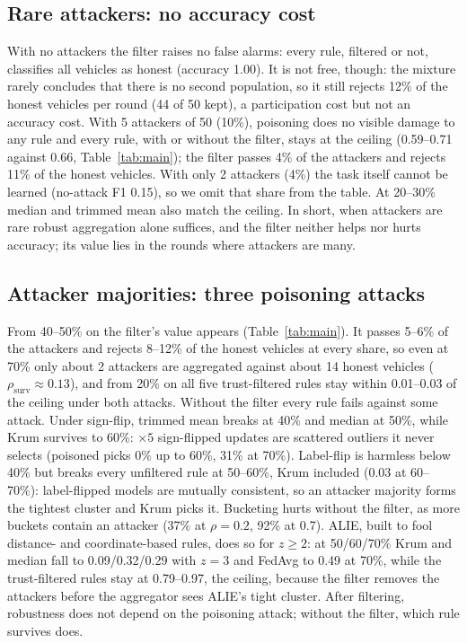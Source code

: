 \documentclass[conference]{IEEEtran}
\newcommand{\rsurv}{\rho_{\mathrm{surv}}}
\begin{document}
\subsection{Rare attackers: no accuracy cost}
\label{sec:rare}
With no attackers the filter raises no false alarms: every rule, filtered or not, classifies all vehicles as
honest (accuracy 1.00). It is not free, though: the mixture rarely concludes that there is no second population,
so it still rejects 12\% of the honest vehicles per round (44 of 50 kept), a participation cost but not an accuracy
cost. With 5 attackers of 50 (10\%), poisoning does no visible damage to any rule and every rule, with or without
the filter, stays at the ceiling (0.59--0.71 against 0.66, Table~\ref{tab:main}); the filter passes 4\% of the
attackers and rejects 11\% of the honest vehicles. With only 2 attackers (4\%) the task itself cannot be learned
(no-attack F1 0.15), so we omit that share from the table. At 20--30\% median and trimmed mean also match the
ceiling. In short, when attackers are rare robust aggregation alone suffices, and the filter neither helps nor hurts
accuracy; its value lies in the rounds where attackers are many.

\subsection{Attacker majorities: three poisoning attacks}

From 40--50\% on the filter's value appears (Table~\ref{tab:main}). It passes 5--6\% of the attackers and rejects
8--12\% of the honest vehicles at every share, so even at 70\% only about 2 attackers are aggregated against about
14 honest vehicles ($\rsurv \approx 0.13$), and from 20\% on all five trust-filtered rules stay within 0.01--0.03 of the
ceiling under both attacks. Without the filter every rule fails against some attack. Under sign-flip, trimmed mean breaks at
40\% and median at 50\%, while Krum survives to 60\%: $\times 5$ sign-flipped updates are scattered outliers it never
selects (poisoned picks 0\% up to 60\%, 31\% at 70\%). Label-flip is harmless below 40\% but breaks every unfiltered
rule at 50--60\%, Krum included (0.03 at 60--70\%): label-flipped models are mutually consistent, so an attacker
majority forms the tightest cluster and Krum picks it. Bucketing hurts without the filter, as more buckets contain
an attacker (37\% at $\rho = 0.2$, 92\% at 0.7). ALIE, built to fool distance- and coordinate-based rules, does so
for $z \ge 2$: at 50/60/70\% Krum and median fall to 0.09/0.32/0.29 with $z = 3$ and FedAvg to 0.49 at 70\%, while
the trust-filtered rules stay at 0.79--0.97, the ceiling, because the filter removes the attackers before the
aggregator sees ALIE's tight cluster. After filtering, robustness does not depend on the poisoning attack; without the
filter, which rule survives does.
\end{document}
